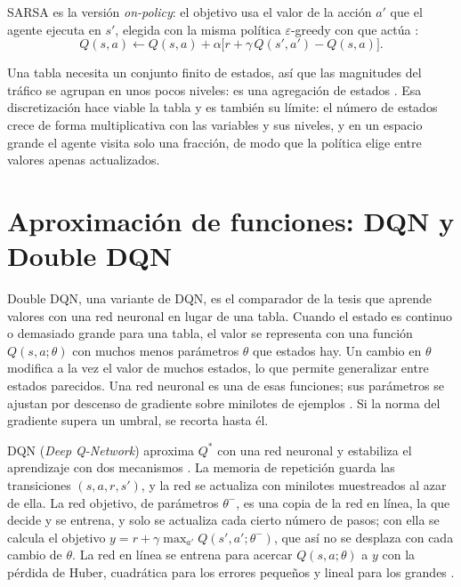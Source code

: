 SARSA es la versión \textit{on-policy}: el objetivo usa el valor de la acción $a'$ que el agente
ejecuta en $s'$, elegida con la misma política $\varepsilon$-greedy con que actúa
\citep{SuttonBarto2018}:
\begin{equation}
  Q(s,a) \leftarrow Q(s,a) + \alpha \bigl[r + \gamma\, Q(s',a') - Q(s,a)\bigr].
  \label{eq:sarsa}
\end{equation}

Una tabla necesita un conjunto finito de estados, así que las magnitudes del tráfico se agrupan en
unos pocos niveles: es una agregación de estados \citep{SuttonBarto2018}. Esa discretización hace
viable la tabla y es también su límite: el número de estados crece de forma multiplicativa con las
variables y sus niveles, y en un espacio grande el agente visita solo una fracción, de modo que la
política elige entre valores apenas actualizados.

\section{Aproximación de funciones: DQN y Double DQN}
\label{sec:dqn}

Double DQN, una variante de DQN, es el comparador de la tesis que aprende valores con una red
neuronal en lugar de una tabla.
Cuando el estado es continuo o demasiado grande para una tabla, el valor se representa con una
función $Q(s,a;\theta)$ con muchos menos parámetros $\theta$ que estados hay. Un cambio en
$\theta$ modifica a la vez el valor de muchos estados, lo que permite generalizar entre estados
parecidos. Una red neuronal es una de esas funciones; sus parámetros se ajustan por descenso de
gradiente sobre minilotes de ejemplos \citep{SuttonBarto2018,Mnih2015_DQN}. Si la norma del
gradiente supera un umbral, se recorta hasta él.

DQN (\textit{Deep Q-Network}) aproxima $Q^*$ con una red neuronal y estabiliza el aprendizaje con
dos mecanismos \citep{Mnih2015_DQN}. La memoria de repetición guarda las transiciones
$(s, a, r, s')$, y la red se actualiza con minilotes muestreados al azar de ella. La red objetivo,
de parámetros $\theta^-$, es una copia de la red en línea, la que decide y se entrena, y solo se
actualiza cada cierto número de pasos; con ella se calcula el objetivo
$y = r + \gamma \max_{a'} Q(s',a';\theta^-)$, que así no se desplaza con cada cambio de $\theta$.
La red en línea se entrena para acercar $Q(s,a;\theta)$ a $y$ con la pérdida de Huber, cuadrática
para los errores pequeños y lineal para los grandes \citep{Mnih2015_DQN}.

